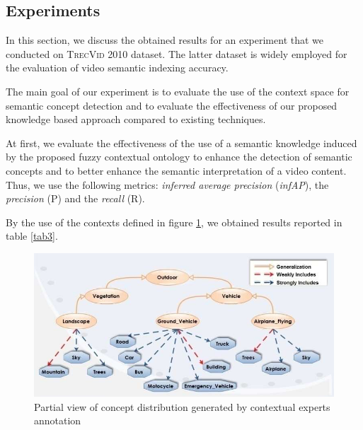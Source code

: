 	\subsection{Experiments}

		In this section, we discuss the obtained results for an experiment that we conducted on 
		\textsc{TrecVid 2010} dataset. The latter dataset is widely employed for the evaluation 
		of video semantic indexing accuracy.
	
		The main goal of our experiment is to evaluate the use of the context space for semantic 
		concept detection and to evaluate the effectiveness of our proposed knowledge based 
		approach compared to existing techniques.

		At first, we evaluate the effectiveness of the use of a semantic knowledge induced 
		by the proposed fuzzy contextual ontology to enhance the detection of semantic concepts 
		and to better enhance the semantic interpretation of a video content. Thus, we use the 
		following metrics:  \textit{inferred average precision} (\textit{infAP}), the 
		\textit{precision} (P) and the \textit{recall} (R). 

		By the use of the contexts defined in figure \ref{contextes}, we obtained results reported in table \ref{tab3}.

		\begin{figure}[ht!]	
			\centering
			\includegraphics[width=\textwidth]{graphics/contextess}
			\caption{Partial view of concept distribution generated by contextual experts annotation}
			\label{contextes}
		\end{figure}



